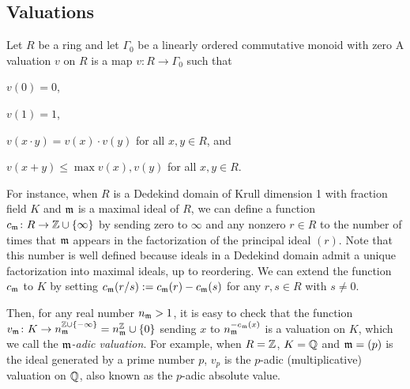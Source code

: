 \documentclass[sigplan,10pt,anonymous,review]{acmart}
\begin{document}
\subsection{Valuations}\label{subsection:valuations}
Let $R$ be a ring and let $\Gamma_0$ be a linearly ordered commutative monoid with zero A valuation $v$ on $R$ is a map $v \colon R \to \Gamma_0$ such that
\begin{listDef}\label{def:valuation}
	\item $v (0) = 0$,\label{def_valuation:zero}
	\item $v (1) = 1$,\label{def_valuation:one}
	\item $v (x \cdot y) = v (x) \cdot v (y)$ for all $x, y \in R$, and\label{def_valuation:mul}
	\item $v (x + y) \le \max {v (x), v (y)}$ for all $x, y \in R$.\label{def_valuation:add}
\end{listDef}

For instance, when $R$ is a Dedekind domain of Krull dimension 1 with fraction field $K$ and $\mathfrak{m}$ is a maximal ideal of $R$, we can define a function $c_{\mathfrak{m}} \colon R \to \mathbb{Z} \cup \{ \infty\}$  by sending zero to $\infty$ and any nonzero $r \in R$ to the number of times that $\mathfrak{m}$ appears in the factorization of the principal ideal $(r)$. Note that this number is well defined because ideals in a Dedekind domain admit a unique factorization into maximal ideals, up to reordering. We can extend the function $c_{\mathfrak{m}}$ to $K$ by setting $c_{\mathfrak{m}} (r/s) := c_{\mathfrak{m}} (r) - c_{\mathfrak{m}} (s)$ for any $r, s \in R$ with $s \ne 0$.

Then, for any real number $n_{\mathfrak{m}} > 1$, it is easy to check that the function
$ v_{\mathfrak{m}}\colon K \to n_{\mathfrak{m}}^{\mathbb{Z} \cup \{-\infty\}} = n_{\mathfrak{m}}^\mathbb{Z} \cup \{0\}$  sending $x$ to $n_{\mathfrak{m}}^{-c_{\mathfrak{m}}(x)}$ is a valuation on $K$, which we call the \textit{$\mathfrak{m}$-adic valuation}. For example, when $R = \mathbb{Z}$, $K = \mathbb{Q}$ and $\mathfrak{m} = (p)$ is the ideal generated by a prime number $p$, $v_p$ is the $p$-adic (multiplicative) valuation on $\mathbb{Q}$, also known as the $p$-adic absolute value.
\end{document}
